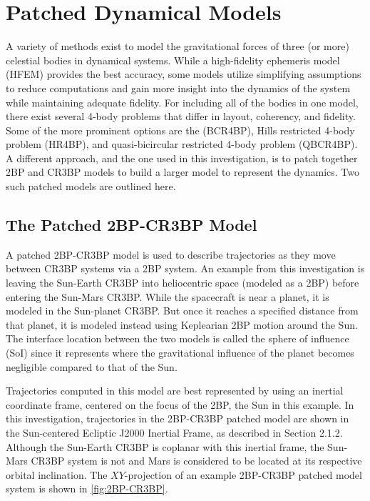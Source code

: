 \section{Patched Dynamical Models}
A variety of methods exist to model the gravitational forces of three (or more) celestial bodies in
dynamical systems. While a high-fidelity ephemeris model (HFEM) provides the best accuracy, some
models utilize simplifying assumptions to reduce computations and gain more insight into the
dynamics of the system while maintaining adequate fidelity. For including all of the bodies in one
model, there exist several 4-body problems that differ in layout, coherency, and fidelity. Some of
the more prominent options are the (BCR4BP)\cite{Boudad:2018}, Hills restricted 4-body problem
(HR4BP)\cite{Scheeres:1998}, and quasi-bicircular restricted 4-body problem
(QBCR4BP)\cite{Andreu:2002}. A different approach, and the one used in this investigation, is to
patch together 2BP and CR3BP models to build a larger model to represent the dynamics. Two such
patched models are outlined here.

\subsection{The Patched 2BP-CR3BP Model}
A patched 2BP-CR3BP model is used to describe trajectories as they move between CR3BP systems via a
2BP system. An example from this investigation is leaving the Sun-Earth CR3BP into heliocentric
space (modeled as a 2BP) before entering the Sun-Mars CR3BP. While the spacecraft is near a planet,
it is modeled in the Sun-planet CR3BP. But once it reaches a specified distance from that planet,
it is modeled instead using Keplearian 2BP motion around the Sun\cite{Canales:2021}. The interface
location between the two models is called the sphere of influence (SoI) since it represents where
the gravitational influence of the planet becomes negligible compared to that of the Sun.

Trajectories computed in this model are best represented by using an inertial coordinate frame,
centered on the focus of the 2BP, the Sun in this example. In this investigation, trajectories in
the 2BP-CR3BP patched model are shown in the Sun-centered Ecliptic J2000 Inertial Frame, as
described in Section 2.1.2. Although the Sun-Earth CR3BP is coplanar with this inertial frame, the
Sun-Mars CR3BP system is not and Mars is considered to be located at its respective orbital
inclination. The $XY$-projection of an example 2BP-CR3BP patched model system is shown in
\cref{fig:2BP-CR3BP}.

